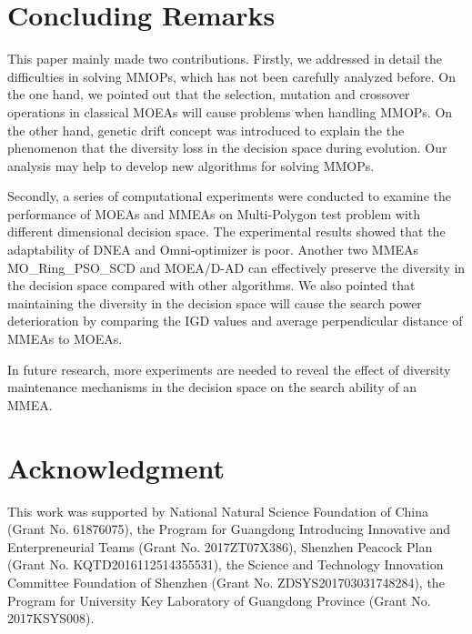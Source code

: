 \documentclass[conference]{IEEEtran}
\begin{document}
\section{Concluding Remarks}
\label{Conclusion}
This paper mainly made two contributions. Firstly, we addressed in detail the difficulties in solving MMOPs, which has not been carefully analyzed before. On the one hand, we pointed out that the selection, mutation and crossover operations in classical MOEAs will cause problems when handling MMOPs. On the other hand, genetic drift concept was introduced to explain the the phenomenon that the diversity loss in the decision space during evolution. Our analysis may help to develop new algorithms for solving MMOPs.

Secondly, a series of computational experiments were conducted to examine the performance of MOEAs and MMEAs on Multi-Polygon test problem with different dimensional decision space. The experimental results showed that the adaptability of DNEA and Omni-optimizer is poor. Another two MMEAs MO\_Ring\_PSO\_SCD and MOEA/D-AD can effectively preserve the diversity in the decision space compared with other algorithms. We also pointed that maintaining the diversity in the decision space will cause the search power deterioration by comparing the IGD values and average perpendicular distance of MMEAs to MOEAs. 

In future research, more experiments are needed to reveal the effect of diversity maintenance mechanisms in the decision space on the search ability of an MMEA.

\section*{Acknowledgment}
This work was supported by National Natural Science Foundation of China (Grant No. 61876075), the Program for Guangdong Introducing Innovative and Enterpreneurial Teams (Grant No. 2017ZT07X386), Shenzhen Peacock Plan (Grant No. KQTD2016112514355531), the Science and Technology Innovation Committee Foundation of Shenzhen (Grant No. ZDSYS201703031748284), the Program for University Key Laboratory of Guangdong Province (Grant No. 2017KSYS008).


\end{document}
